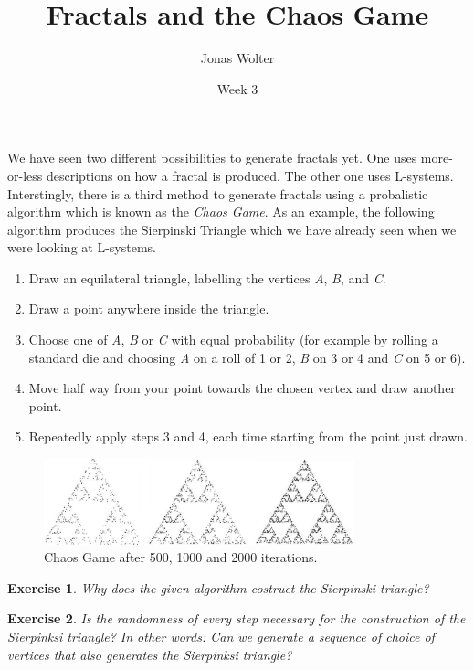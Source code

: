 \documentclass[11pt,a5paper]{article}
\title{\textbf{Fractals and the Chaos Game}}
\date{Week 3}
\author{Jonas Wolter}
\newtheorem{exercise}{Exercise}
\begin{document}
\maketitle

\noindent We have seen two different possibilities to generate fractals yet. One uses more-or-less descriptions on how a fractal is produced. The other one uses L-systems. \\ 
Interstingly, there is a third method to generate fractals using a probalistic algorithm which is known as the \emph{Chaos Game}.
As an example, the following algorithm produces the Sierpinski Triangle which we have already seen when we were looking at L-systems.

\begin{enumerate}

\item {Draw an equilateral triangle, labelling the vertices \emph{A},\emph{ B}, and \emph{C}.}
\item {Draw a point anywhere inside the triangle.}
\item {Choose one of \emph{A},\emph{ B} or \emph{C} with equal probability (for example by rolling a standard die and
choosing \emph{A} on a roll of 1 or 2, \emph{B} on 3 or 4 and \emph{C} on 5 or 6).}
\item {Move half way from your point towards the chosen vertex and draw another point.}
\item {Repeatedly apply steps 3 and 4, each time starting from the point just drawn.}

\end{enumerate}

\begin{figure}[h!]
\begin{center}
\includegraphics[width=9cm]{sierpinski-3panel.jpg}
\caption{Chaos Game after 500, 1000 and 2000 iterations.}
\end{center}
\end{figure}

\begin{exercise}
Why does the given algorithm costruct the Sierpinski triangle?
\end{exercise}

\begin{exercise}
Is the randomness of every step necessary for the construction of the Sierpinksi triangle? In other words: Can we generate a sequence of choice of vertices that also generates the Sierpinksi triangle?
\end{exercise}
\end{document}
